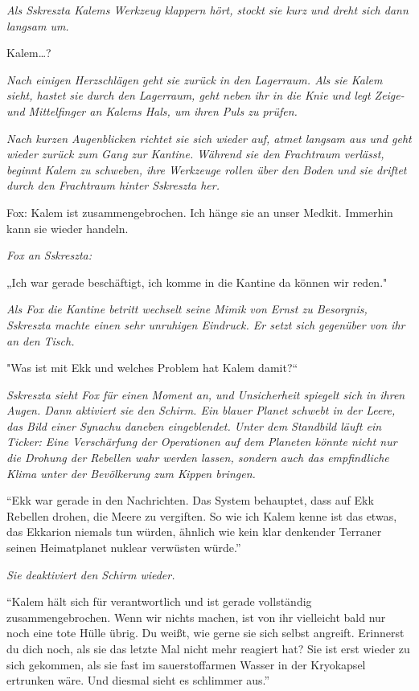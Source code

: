 \documentclass[11pt]{article}
\begin{document}
\emph{Als Sskreszta Kalems Werkzeug klappern hört, stockt sie kurz und
dreht sich dann langsam um.}

Kalem\ldots{}?

\emph{Nach einigen Herzschlägen geht sie zurück in den Lagerraum. Als
sie Kalem sieht, hastet sie durch den Lagerraum, geht neben ihr in die
Knie und legt Zeige- und Mittelfinger an Kalems Hals, um ihren Puls zu
prüfen.}

\emph{Nach kurzen Augenblicken richtet sie sich wieder auf, atmet
langsam aus und geht wieder zurück zum Gang zur Kantine. Während sie den
Frachtraum verlässt, beginnt Kalem zu schweben, ihre Werkzeuge rollen
über den Boden und sie driftet durch den Frachtraum hinter Sskreszta
her.}

Fox: Kalem ist zusammengebrochen. Ich hänge sie an unser Medkit.
Immerhin kann sie wieder handeln.

\emph{Fox an Sskreszta:}

„Ich war gerade beschäftigt, ich komme in die Kantine da können wir
reden."

\emph{Als Fox die Kantine betritt wechselt seine Mimik von Ernst zu
Besorgnis, Sskreszta machte einen sehr unruhigen Eindruck. Er setzt sich
gegenüber von ihr an den Tisch.}

"Was ist mit Ekk und welches Problem hat Kalem damit?``

\emph{Sskreszta sieht Fox für einen Moment an, und Unsicherheit spiegelt
sich in ihren Augen. Dann aktiviert sie den Schirm. Ein blauer Planet
schwebt in der Leere, das Bild einer Synachu daneben eingeblendet. Unter
dem Standbild läuft ein Ticker: Eine Verschärfung der Operationen auf
dem Planeten könnte nicht nur die Drohung der Rebellen wahr werden
lassen, sondern auch das empfindliche Klima unter der Bevölkerung zum
Kippen bringen.}

``Ekk war gerade in den Nachrichten. Das System behauptet, dass auf Ekk
Rebellen drohen, die Meere zu vergiften. So wie ich Kalem kenne ist das
etwas, das Ekkarion niemals tun würden, ähnlich wie kein klar denkender
Terraner seinen Heimatplanet nuklear verwüsten würde.''

\emph{Sie deaktiviert den Schirm wieder.}

``Kalem hält sich für verantwortlich und ist gerade vollständig
zusammengebrochen. Wenn wir nichts machen, ist von ihr vielleicht bald
nur noch eine tote Hülle übrig. Du weißt, wie gerne sie sich selbst
angreift. Erinnerst du dich noch, als sie das letzte Mal nicht mehr
reagiert hat? Sie ist erst wieder zu sich gekommen, als sie fast im
sauerstoffarmen Wasser in der Kryokapsel ertrunken wäre. Und diesmal
sieht es schlimmer aus.''
\end{document}

